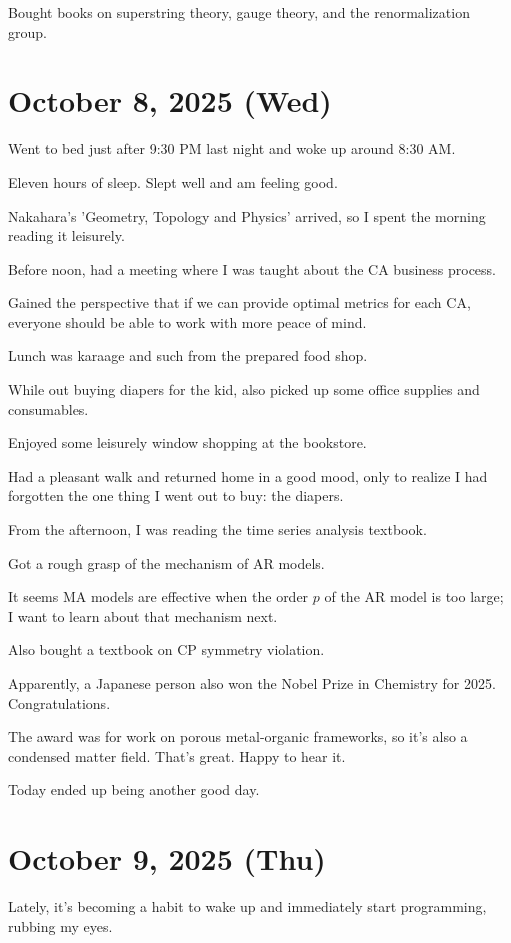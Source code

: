 \documentclass[uplatex]{jsarticle}
\begin{document}
Bought books on superstring theory, gauge theory, and the renormalization group.

\section{October 8, 2025 (Wed)}

Went to bed just after 9:30 PM last night and woke up around 8:30 AM.

Eleven hours of sleep. Slept well and am feeling good.

Nakahara's 'Geometry, Topology and Physics' arrived, so I spent the morning reading it leisurely.

Before noon, had a meeting where I was taught about the CA business process.

Gained the perspective that if we can provide optimal metrics for each CA, everyone should be able to work with more peace of mind.

Lunch was karaage and such from the prepared food shop.

While out buying diapers for the kid, also picked up some office supplies and consumables.

Enjoyed some leisurely window shopping at the bookstore.

Had a pleasant walk and returned home in a good mood, only to realize I had forgotten the one thing I went out to buy: the diapers.

From the afternoon, I was reading the time series analysis textbook.

Got a rough grasp of the mechanism of AR models.

It seems MA models are effective when the order $p$ of the AR model is too large; I want to learn about that mechanism next.

Also bought a textbook on CP symmetry violation.

Apparently, a Japanese person also won the Nobel Prize in Chemistry for 2025. Congratulations.

The award was for work on porous metal-organic frameworks, so it's also a condensed matter field. That's great. Happy to hear it.

Today ended up being another good day.

\section{October 9, 2025 (Thu)}

Lately, it's becoming a habit to wake up and immediately start programming, rubbing my eyes.
\end{document}
